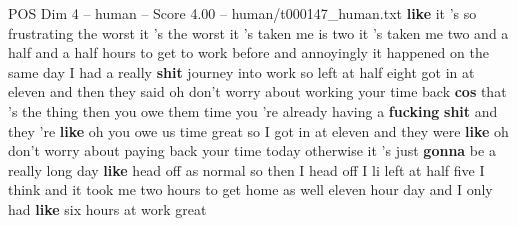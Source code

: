 \begin{textsample}{POS Dim 4 – human – Score 4.00 – human/t000147\_human.txt}  \label{ex:f4_pos_004}
\textbf{like} it 's so frustrating the worst it 's the worst it 's taken me is two it 's taken me two and a half and a half hours to get to work before and annoyingly it happened on the same day I had a really \textbf{shit} journey into work so left at half eight got in at eleven and then they said oh don't worry about working your time back \textbf{cos} that 's the thing then you owe them time you 're already having a \textbf{fucking} \textbf{shit} and they 're \textbf{like} oh you owe us time great so I got in at eleven and they were \textbf{like} oh don't worry about paying back your time today otherwise it 's just \textbf{gonna} be a really long day \textbf{like} head off as normal so then I head off I li left at half five I think and it took me two hours to get home as well eleven hour day and I only had \textbf{like} six hours at work great

\end{textsample}
